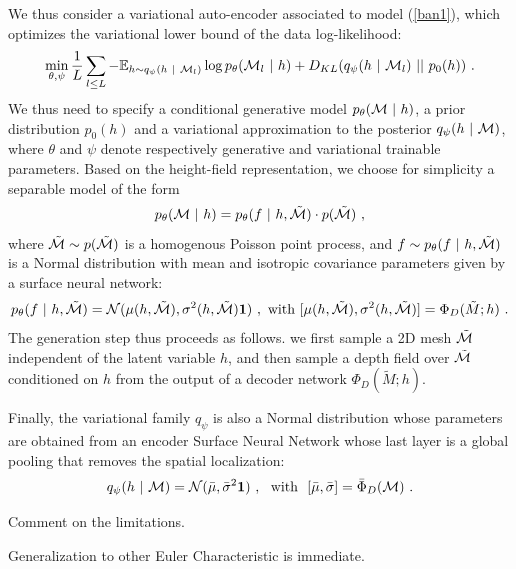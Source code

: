 We thus consider a variational auto-encoder associated to model (\ref{ban1}), 
which optimizes the variational lower bound of the data log-likelihood:
\begin{equation}
\min_{\theta, \psi} \frac{1}{L} \sum_{l \leq L} - {\mathbb{E}}_{ h \sim q_\psi(h ~|~{\mathcal{M}}_l)} \log p_\theta( {\mathcal{M}}_l ~|~h) + D_{KL}( q_\psi( h~|~{\mathcal{M}}_l) ~||~p_0(h) )~.
\end{equation}
We thus need to specify a conditional generative model $p_\theta({\mathcal{M}} ~|~h)$, 
a prior distribution $p_0(h)$ and a variational approximation to the posterior
$q_\psi( h ~|~ {\mathcal{M}})$, where $\theta$ and $\psi$ denote respectively generative 
and variational trainable parameters.
Based on the height-field representation, we choose for simplicity a separable model of the form
$$p_\theta({\mathcal{M}} ~|~h) =  p_\theta( f~|~h, \tilde{{\mathcal{M}}}) \cdot p(\tilde{{\mathcal{M}}}) ~,$$
where $\tilde{{\mathcal{M}}} \sim p(\tilde{{\mathcal{M}}})$ is a homogenous Poisson point process, 
and $f \sim p_\theta( f~|~h, \tilde{{\mathcal{M}}})$ is a Normal distribution with 
mean and isotropic covariance parameters given by a surface neural network:
$$p_\theta( f~|~h, \tilde{{\mathcal{M}}}) = {\cal N}( \mu(h, \tilde{{\mathcal{M}}}), \sigma^2(h, \tilde{{\mathcal{M}}}) {\bf 1})~,~\text{with } [ \mu(h, \tilde{{\mathcal{M}}}), \sigma^2(h, \tilde{{\mathcal{M}}})] = \Phi_D(\tilde{M}; h)~.$$
The generation step thus proceeds as follows.
we first sample a 2D mesh $\tilde{{\mathcal{M}}}$ independent of the latent variable $h$, 
and then sample a depth field over $\tilde{{\mathcal{M}}}$ conditioned on $h$ from the output
of a decoder network $\Phi_D(\tilde{M}; h)$.

Finally, the variational family $q_\psi$ is also a Normal distribution whose parameters 
are obtained from an encoder Surface Neural Network whose last layer is a global pooling that removes 
the spatial localization:
$$q_\psi( h~|~{\mathcal{M}}) = {\cal N}(\bar{\mu}, \bar{\sigma}^2 {\bf 1})~,~\text{ with }~ [\bar{\mu}, \bar{\sigma}] = \bar{\Phi}_D({\mathcal{M}})~.$$

Comment on the limitations.

Generalization to other Euler Characteristic is immediate. 


